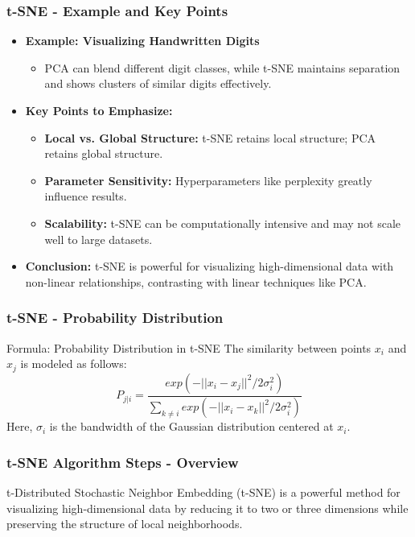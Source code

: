 \documentclass{beamer}
\begin{document}
\begin{frame}[fragile]
    \frametitle{t-SNE - Example and Key Points}
    \begin{itemize}
        \item \textbf{Example: Visualizing Handwritten Digits}
        \begin{itemize}
            \item PCA can blend different digit classes, while t-SNE maintains separation and shows clusters of similar digits effectively.
        \end{itemize}
        
        \item \textbf{Key Points to Emphasize:}
        \begin{itemize}
            \item \textbf{Local vs. Global Structure:} t-SNE retains local structure; PCA retains global structure.
            \item \textbf{Parameter Sensitivity:} Hyperparameters like perplexity greatly influence results.
            \item \textbf{Scalability:} t-SNE can be computationally intensive and may not scale well to large datasets.
        \end{itemize}
        
        \item \textbf{Conclusion:} t-SNE is powerful for visualizing high-dimensional data with non-linear relationships, contrasting with linear techniques like PCA.
    \end{itemize}
\end{frame}

\begin{frame}[fragile]
    \frametitle{t-SNE - Probability Distribution}
    \begin{block}{Formula: Probability Distribution in t-SNE}
        The similarity between points \( x_i \) and \( x_j \) is modeled as follows:
        \begin{equation}
            P_{j|i} = \frac{exp(-||x_i - x_j||^2/2\sigma_i^2)}{\sum_{k \neq i} exp(-||x_i - x_k||^2/2\sigma_i^2)}
        \end{equation}
        Here, \( \sigma_i \) is the bandwidth of the Gaussian distribution centered at \( x_i \).
    \end{block}
\end{frame}

\begin{frame}[fragile]
    \frametitle{t-SNE Algorithm Steps - Overview}
    t-Distributed Stochastic Neighbor Embedding (t-SNE) is a powerful method for visualizing high-dimensional data by reducing it to two or three dimensions while preserving the structure of local neighborhoods. 
\end{frame}
\end{document}
